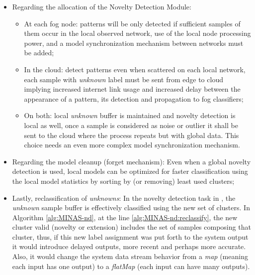 \begin{itemize}
  \item Regarding the allocation of the Novelty Detection Module:
  \begin{itemize}
    
    \item At each fog node: patterns will be only detected if sufficient samples
    of them occur in the local observed network, use of the local node
    processing power, and a model synchronization mechanism between networks
    must be added;

    \item In the cloud: detect patterns even when scattered on each local
    network, each sample with \emph{unknown} label must be sent from edge to
    cloud implying increased internet link usage and increased delay between the
    appearance of a pattern, its detection and propagation to fog classifiers;

    \item On both: local \emph{unknown} buffer is maintained and novelty
    detection is local as well, once a sample is considered as noise or outlier
    it shall be sent to the cloud where the process repeats but with global
    data.
    This choice needs an even more complex model synchronization mechanism.

  \end{itemize}
    
  \item Regarding the model cleanup (forget mechanism): Even when a global
  novelty detection is used, local models can be optimized for faster
  classification using the local model statistics by sorting by (or removing)
  least used clusters;

  \item Lastly, reclassification of \emph{unknowns}: In the novelty detection
  task in \minas, the \emph{unknown} sample buffer is effectively classified
  using the new set of clusters.
  In Algorithm \ref{alg:MINAS-nd}, at the line \ref{alg:MINAS-nd:reclassify}, the
  new cluster valid (novelty or extension) includes the set of samples composing
  that cluster, thus, if this new label assignment was put forth to the system
  output it would introduce delayed outputs, more recent and perhaps more
  accurate.
  Also, it would change the system data stream behavior from a \emph{map}
  (meaning each input has one output) to a \emph{flatMap} (each input can have
  many outputs).

\end{itemize}

